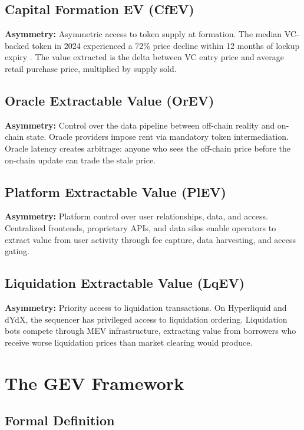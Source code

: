 \documentclass[11pt, a4paper]{article}
\begin{document}
\subsection{Capital Formation EV (CfEV)}

\textbf{Asymmetry:} Asymmetric access to token supply at formation. The median VC-backed token in 2024 experienced a 72\% price decline within 12 months of lockup expiry \citep{messari2024}. The value extracted is the delta between VC entry price and average retail purchase price, multiplied by supply sold.

\subsection{Oracle Extractable Value (OrEV)}

\textbf{Asymmetry:} Control over the data pipeline between off-chain reality and on-chain state. Oracle providers impose rent via mandatory token intermediation. Oracle latency creates arbitrage: anyone who sees the off-chain price before the on-chain update can trade the stale price.

\subsection{Platform Extractable Value (PlEV)}

\textbf{Asymmetry:} Platform control over user relationships, data, and access. Centralized frontends, proprietary APIs, and data silos enable operators to extract value from user activity through fee capture, data harvesting, and access gating.

\subsection{Liquidation Extractable Value (LqEV)}

\textbf{Asymmetry:} Priority access to liquidation transactions. On Hyperliquid and dYdX, the sequencer has privileged access to liquidation ordering. Liquidation bots compete through MEV infrastructure, extracting value from borrowers who receive worse liquidation prices than market clearing would produce.

\section{The GEV Framework}

\subsection{Formal Definition}
\end{document}
